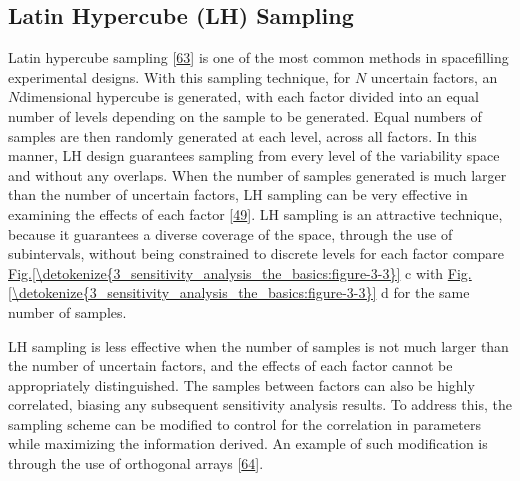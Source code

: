 \documentclass[letterpaper,10pt,english]{sphinxmanual}
\begin{document}
\subsection{Latin Hypercube (LH) Sampling}
\label{\detokenize{3_sensitivity_analysis_the_basics:latin-hypercube-lh-sampling}}
\sphinxAtStartPar
Latin hypercube sampling {[}\hyperlink{cite.index:id91}{63}{]} is one of the most common methods in space\sphinxhyphen{}filling experimental designs. With this sampling technique, for \(N\) uncertain factors, an \(N\)\sphinxhyphen{}dimensional hypercube is generated, with each factor divided into an equal number of levels depending on the sample to be generated. Equal numbers of samples are then randomly generated at each level, across all factors. In this manner, LH design guarantees sampling from every level of the variability space and without any overlaps. When the number of samples generated is much larger than the number of uncertain factors, LH sampling can be very effective in examining the effects of each factor {[}\hyperlink{cite.index:id28}{49}{]}. LH sampling is an attractive technique, because it guarantees a diverse coverage of the space, through the use of subintervals, without being constrained to discrete levels for each factor \sphinxhyphen{} compare \hyperref[\detokenize{3_sensitivity_analysis_the_basics:figure-3-3}]{Fig.\@ \ref{\detokenize{3_sensitivity_analysis_the_basics:figure-3-3}}} c with \hyperref[\detokenize{3_sensitivity_analysis_the_basics:figure-3-3}]{Fig.\@ \ref{\detokenize{3_sensitivity_analysis_the_basics:figure-3-3}}} d for the same number of samples.

\sphinxAtStartPar
LH sampling is less effective when the number of samples is not much larger than the number of uncertain factors, and the effects of each factor cannot be appropriately distinguished. The samples between factors can also be highly correlated, biasing any subsequent sensitivity analysis results. To address this, the sampling scheme can be modified to control for the correlation in parameters while maximizing the information derived. An example of such modification is through the use of orthogonal arrays {[}\hyperlink{cite.index:id21}{64}{]}.
\end{document}
